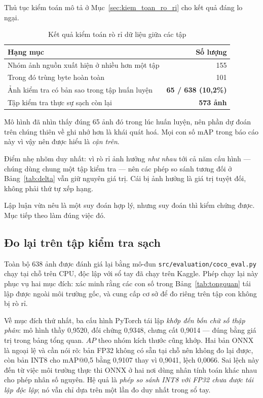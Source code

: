 Thủ tục kiểm toán mô tả ở Mục~\ref{sec:kiem_toan_ro_ri} cho kết quả đáng lo ngại.

\begin{table}[H]
\centering
\caption{Kết quả kiểm toán rò rỉ dữ liệu giữa các tập}
\label{tab:ro_ri}
\small
\begin{tabular}{lr}
\toprule
\textbf{Hạng mục} & \textbf{Số lượng} \\
\midrule
Nhóm ảnh nguồn xuất hiện ở nhiều hơn một tập & 155 \\
Trong đó trùng byte hoàn toàn                & 101 \\
Ảnh kiểm tra có bản sao trong tập huấn luyện & \textbf{65 / 638 (10,2\%)} \\
Tập kiểm tra thực sự sạch còn lại            & \textbf{573 ảnh} \\
\bottomrule
\end{tabular}
\end{table}

Mô hình đã nhìn thấy đúng 65 ảnh đó trong lúc huấn luyện, nên phần dự đoán trên chúng thiên về ghi
nhớ hơn là khái quát hoá. Mọi con số mAP trong báo cáo này vì vậy nên được hiểu là \emph{cận trên}.

Điểm nhẹ nhõm duy nhất: vì rò rỉ ảnh hưởng \emph{như nhau} tới cả năm cấu hình --- chúng dùng chung
một tập kiểm tra --- nên các phép so sánh tương đối ở Bảng~\ref{tab:delta} vẫn giữ nguyên giá trị.
Cái bị ảnh hưởng là giá trị tuyệt đối, không phải thứ tự xếp hạng.

Lập luận vừa nêu là một suy đoán hợp lý, nhưng suy đoán thì kiểm chứng được. Mục tiếp theo làm đúng
việc đó.

\subsection{Đo lại trên tập kiểm tra sạch}
\label{sec:tap_sach}

Toàn bộ 638 ảnh được đánh giá lại bằng mô-đun \texttt{src/evaluation/coco\_eval.py} chạy tại chỗ
trên CPU, độc lập với sổ tay đã chạy trên Kaggle. Phép chạy lại này phục vụ hai mục đích: xác minh
rằng các con số trong Bảng~\ref{tab:tongquan} tái lập được ngoài môi trường gốc, và cung cấp cơ sở
để đo riêng trên tập con không bị rò rỉ.

Về mục đích thứ nhất, ba cấu hình PyTorch tái lập \emph{khớp đến bốn chữ số thập phân}: mô hình thầy
0,9520, đối chứng 0,9348, chưng cất 0,9014 --- đúng bằng giá trị trong bảng tổng quan. $AP$ theo
nhóm kích thước cũng khớp. Hai bản ONNX là ngoại lệ và cần nói rõ: bản FP32 không có sẵn tại chỗ nên
không đo lại được, còn bản INT8 cho mAP@0,5 bằng 0,9107 thay vì 0,9041, lệch 0,0066. Sai lệch này
đến từ việc môi trường thực thi ONNX ở hai nơi dùng nhân tính toán khác nhau cho phép nhân số
nguyên. Hệ quả là \emph{phép so sánh INT8 với FP32 chưa được tái lập độc lập}; nó vẫn chỉ dựa trên
một lần đo duy nhất trong sổ tay.

